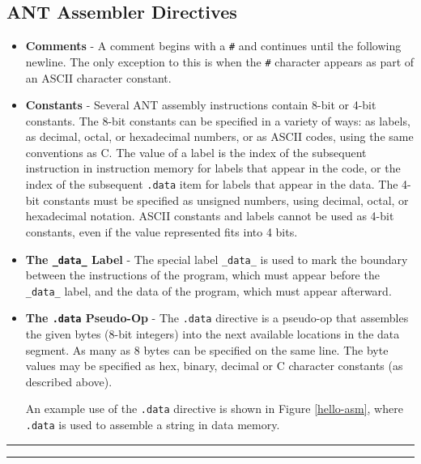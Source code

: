\subsection{ANT Assembler Directives}

\begin{itemize}

\item {\bf Comments} -
	A comment begins with a \verb$#$ and continues until the
	following newline.  The only exception to this is when the
	\verb$#$ character appears as part of an ASCII character
	constant.

\item {\bf Constants} -
	Several ANT assembly instructions contain 8-bit or 4-bit
	constants.  The 8-bit constants can be specified in a variety
	of ways:  as labels, as decimal, octal, or hexadecimal
	numbers, or as ASCII codes, using the same conventions as C. 
	The value of a label is the index of the subsequent
	instruction in instruction memory for labels that appear in
	the code, or the index of the subsequent {\tt .data} item for
	labels that appear in the data.  The 4-bit constants must be
	specified as unsigned numbers, using decimal, octal,
	or hexadecimal notation.  ASCII constants and labels
	cannot be used as 4-bit constants, even if the value
	represented fits into 4 bits.

\item {\bf The {\tt \_data\_} Label} -
	The special label {\tt \_data\_} is used to mark the boundary
	between the instructions of the program, which must appear
	before the {\tt \_data\_} label, and the data of the program,
	which must appear afterward.

\item {\bf The {\tt .data} Pseudo-Op} -
	The {\tt .data} directive is a pseudo-op that
	assembles the given bytes (8-bit integers) into the next
	available locations in the data segment.  As many as 8 bytes
	can be specified on the same line.  The byte values
	may be specified as
	hex, binary, decimal or C character constants (as described above).

	An example use of the {\tt .data} directive is shown in
	Figure \ref{hello-asm}, where {\tt .data} is used to assemble
	a string in data memory.

\end{itemize}

\begin{figure*}
\caption{ \label{hello-asm} The ``Hello World'' program, written in ANT
	assembly language. }
\vspace{3mm}
\hrule

{\small

}
\hrule
\end{figure*}

